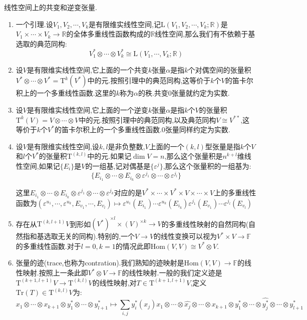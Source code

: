 线性空间上的共变和逆变张量.
\begin{enumerate}
	\item 一个引理.设$V_1,V_2,\cdots,V_k$是有限维实线性空间,记$\mathrm{L}(V_1,V_2,\cdots,V_k;\mathbb{R})$是$V_1\times\cdots\times V_k\to\mathbb{R}$的全体多重线性函数构成的$\mathbb{R}$线性空间,那么我们有不依赖于基选取的典范同构:
	$$V_1^*\otimes\cdots\otimes V_k^*\cong\mathrm{L}(V_1,\cdots,V_k;\mathbb{R})$$
	\item 设$V$是有限维实线性空间,它上面的一个共变$k$张量$\alpha$是指$k$个对偶空间的张量积$V^*\otimes\cdots\otimes V^*=\mathrm{T}^k(V^*)$中的元.按照引理中的典范同构,这等价于$k$个$V$的笛卡尔积上的一个多重线性函数.这里的$k$称为$\alpha$的秩.共变0张量就约定为实数.
	\item 设$V$是有限维实线性空间,它上面的一个逆变$k$张量$\alpha$是指$k$个$V$的张量积$\mathrm{T}^k(V)=V\otimes\cdots\otimes V$中的元.按照引理中的典范同构,以及典范同构$V\cong V^{**}$,这等价于$k$个$V^*$的笛卡尔积上的一个多重线性函数.0张量同样约定为实数.
	\item 设$V$是有限维实线性空间,设$k,l$是非负整数,$V$上面的一个$(k,l)$型张量是指$k$个$V$和$l$个$V^*$的张量积$\mathrm{T}^{(k,l)}$中的元.如果记$\dim V=n$,那么这个张量积是$n^{k+l}$维线性空间,如果记$\{E_i\}$是$V$的一组基,记对偶基是$\{\varepsilon^j\}$,那么这个张量积的一组基为:
	$$\{E_{i_1}\otimes\cdots\otimes E_{i_k}\otimes\varepsilon^{j_1}\otimes\cdots\otimes\varepsilon^{j_l}\}$$
	
	这里$E_{i_1}\otimes\cdots\otimes E_{i_k}\otimes\varepsilon^{j_1}\otimes\cdots\otimes\varepsilon^{j_k}$对应的是$V^*\times\cdots\times V^*\times V\times\cdots\times V$上的多重线性函数为$(\varepsilon^{u_1},\cdots,\varepsilon^{u_k},E_{v_1},\cdots,E_{v_l})\mapsto\varepsilon^{u_1}(E_{i_1})\cdots\varepsilon^{u_k}(E_{i_k})\varepsilon^{j_1}(E_{v_1})\cdots\varepsilon^{j_l}(E_{v_l})$
	\item 存在从$\mathrm{T}^{(k,l+1)}V$到形如$(V^*)^{\times l}\times(V)^{\times k}\to V$的多重线性映射的自然同构(自然指和基选取无关的同构).特别的,一个$V\to V$的线性变换可以视为$V^*\times V\to\mathbb{F}$的多重线性函数.对于$l=0,k=1$的情况此即$\mathrm{Hom}(V,V)\cong V^*\otimes V$.
	\item 张量的迹(trace,也称为contration).我们熟知的迹映射是$\mathrm{Hom}(V,V)\to\mathbb{F}$的线性映射.按照上一条此即$V^*\otimes V\to\mathbb{F}$的线性映射.一般的我们定义迹是$\mathrm{T}^{(k+1,l+1)}V\to\mathrm{T}^{(k,l)}V$的线性映射,对$T\in\mathrm{T}^{(k+1,l+1)}V$,定义$\mathrm{Tr}(T)\in\mathrm{T}^{(k,l)}V$为:
	$$x_1\otimes\cdots\otimes x_{k+1}\otimes y_1^*\otimes\cdots\otimes y_{l+1}^*\mapsto\sum_{i,j}y_i^*(x_j)x_1\otimes\cdots\otimes\widehat{x_j}\otimes\cdots\otimes x_{k+1}\otimes y_1^*\otimes\cdots\otimes\widehat{y_j^*}\otimes\cdots\otimes y_{l+1}^*$$
\end{enumerate}

